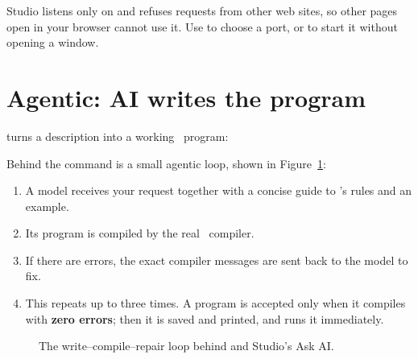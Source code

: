 \begin{note}
Studio listens only on  and refuses requests from other web sites, so other pages open in your browser cannot use it. Use  to choose a port, or  to start it without opening a window.
\end{note}

\section{Agentic: AI writes the program}
\label{sec:ask}

 turns a description into a working \algolang\ program:


Behind the command is a small agentic loop, shown in Figure~\ref{fig:askloop}:

\begin{enumerate}
  \item A model receives your request together with a concise guide to \algolang's rules and an example.
  \item Its program is compiled by the real \algolang\ compiler.
  \item If there are errors, the exact compiler messages are sent back to the model to fix.
  \item This repeats up to three times. A program is accepted only when it compiles with \textbf{zero errors}; then it is saved and printed, and  runs it immediately.
\end{enumerate}

\begin{figure}[ht]
\centering
{}
\caption{The write–compile–repair loop behind  and Studio's Ask AI.}
\label{fig:askloop}
\end{figure}

